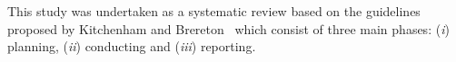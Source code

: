 This study was undertaken as a systematic review based on the guidelines proposed by Kitchenham and Brereton~\cite{Kitchenham} which consist of three main phases: (\textit{i}) planning, (\textit{ii}) conducting and (\textit{iii}) reporting. %

